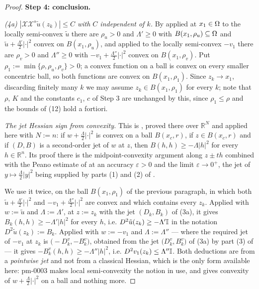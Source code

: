 \begin{proof}
\medskip\noindent\textbf{Step 4: conclusion.}

\emph{(4a) $|\mathcal X\mathcal X^{s}\tilde u(z_k)|\le C$ with $C$ independent of $k$.}
By  applied at $x_1\in\Omega$ to the locally semi-convex
$\tilde u$ there are $\rho_u>0$ and $\Lambda'\ge0$ with $B(x_1,\rho_u)\subseteq\Omega$ and
$\tilde u+\frac{\Lambda'}2|\cdot|^{2}$ convex on $B(x_1,\rho_u)$, and applied to the locally
semi-convex $-v_1$ there are $\rho_v>0$ and $\Lambda''\ge0$ with
$-v_1+\frac{\Lambda''}2|\cdot|^{2}$ convex on $B(x_1,\rho_v)$. Put
$\rho_1:=\min\{\rho,\rho_u,\rho_v\}>0$; a convex function on a ball is convex on every
smaller concentric ball, so both functions are convex on $B(x_1,\rho_1)$. Since $z_k\to x_1$,
discarding finitely many $k$ we may assume $z_k\in B(x_1,\rho_1)$ for every $k$; note that
$\rho$, $K$ and the constants $c_1$, $c$ of Step 3 are unchanged by this, since
$\rho_1\le\rho$ and the bounds of (12) hold a fortiori.

\emph{The jet Hessian sign from convexity.} This is
, proved there over $\mathbb R^{N}$ and applied here
with $N:=n$: if $w+\frac\Lambda2|\cdot|^{2}$ is convex on a ball $B(x_c,r)$, if
$z\in B(x_c,r)$ and if $(D,B)$ is a second-order jet of $w$ at $z$, then
$B(h,h)\ge-\Lambda|h|^{2}$ for every $h\in\mathbb R^{n}$. Its proof there is the
midpoint-convexity argument along $z\pm th$ combined with the Peano estimate of
 at an accuracy $\varepsilon>0$ and the limit $\varepsilon\to0^{+}$,
the jet of $y\mapsto\frac\Lambda2|y|^{2}$ being supplied by parts (1) and (2) of
.

We use it twice, on the ball $B(x_1,\rho_1)$ of the previous paragraph, in which both
$\tilde u+\frac{\Lambda'}2|\cdot|^{2}$ and $-v_1+\frac{\Lambda''}2|\cdot|^{2}$ are convex
and which contains every $z_k$. Applied with $w:=\tilde u$ and $\Lambda:=\Lambda'$, at
$z:=z_k$ with the jet $(D_k,B_k)$ of (3a), it gives $B_k(h,h)\ge-\Lambda'|h|^{2}$ for every
$h$, i.e. $D^{2}\tilde u(z_k)\ge-\Lambda'\mathbb{I}$ in the notation $D^{2}\tilde u(z_k):=B_k$.
Applied with $w:=-v_1$ and $\Lambda:=\Lambda''$ --- where the required jet of $-v_1$ at
$z_k$ is $\big(-D^{v}_k,-B^{v}_k\big)$, obtained from the jet $\big(D^{v}_k,B^{v}_k\big)$
of (3a) by part (3) of  --- it gives
$-B^{v}_k(h,h)\ge-\Lambda''|h|^{2}$, i.e. $D^{2}v_1(z_k)\le\Lambda''\mathbb{I}$. Both deductions
are from a \emph{pointwise jet} and not from
a classical Hessian, which is the only form available here: pm-0003 makes local
semi-convexity the notion in use, and  gives convexity of
$w+\frac\Lambda2|\cdot|^{2}$ on a ball and nothing more.


\end{proof}
